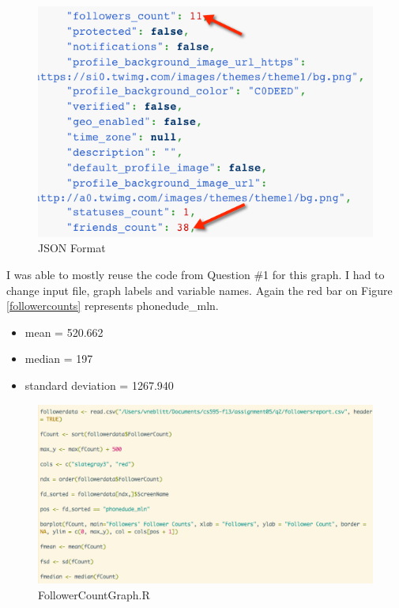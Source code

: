 \documentclass{article}
\begin{document}
\begin{figure}[H]
\centering
\includegraphics[scale=0.50]{q2/jsonformat}
\caption{JSON Format}
\label{jsonformat}
\end{figure}

I was able to mostly reuse the code from Question \#1 for this graph. I had to change input file, graph labels and variable names. Again the red bar on Figure \ref{followercounts} represents phonedude\_mln.

\begin{itemize}
\item mean = 520.662
\item median = 197
\item standard deviation = 1267.940
\end{itemize}

\begin{figure}[H]
\centering
\includegraphics[scale=0.40]{q2/rscriptTfollowers}
\caption{FollowerCountGraph.R}
\label{followercountgraph}
\end{figure}
\end{document}
